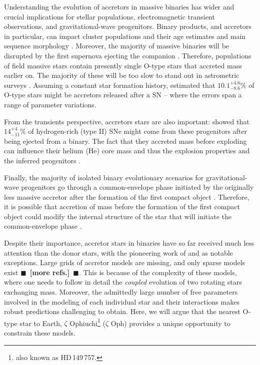 \documentclass[twocolumn,twocolappendix,trackchanges]{aastex63}
\newcommand{\zoph}{$\zeta$ Oph}
\newcommand{\todo}[1]{{\large $\blacksquare$~\textbf{\color{red}[#1]}}~$\blacksquare$}
\begin{document}
Understanding the evolution of accretors in massive binaries has wider
and crucial implications for stellar populations, electromagnetic
transient observations, and gravitational-wave progenitors. Binary
products, and accretors in particular, can impact cluster populations
and their age estimates and main sequence morphology
\citep[e.g.,][]{pols_marinus:94, wang:20}. Moreover, the majority of
massive binaries will be disrupted by the first supernova ejecting the
companion \citep[``binary SN scenario'', ][]{blaauw:61, dedonder:97,
  eldridge:11, renzo:19walk, evans:20}. Therefore, populations of
field massive stars contain presently single O-type stars that
accreted mass earlier on. The majority of these will be too slow to
stand out in astrometric surveys \citep[e.g.,][]{eldridge:11,
  renzo:19walk}. Assuming a constant star formation
history, \cite{renzo:19walk} estimated that $10.1^{+4.6}_{-8.6}\%$ of
O-type stars might be accretors released after a SN -- where the
errors span a range of parameter variations.

From the transients
perspective, accretors stars are also important: \cite{zapartas:19}
showed that $14_{-11}^{+4}\%$ of hydrogen-rich (type II) SNe might
come from these progenitors after being ejected from a binary. The
fact that they accreted mass before exploding can influence their
helium (He) core mass and thus the explosion properties and the
inferred progenitors \citep{zapartas:21}.

Finally, the majority of
isolated binary evolutionary scenarios for gravitational-wave
progenitors go through a common-envelope phase initiated by the
originally less massive accretor after the formation of the first
compact object \citep[e.g.,][]{belczynski:16nat, tauris:17,
  broekgaarden:21}. Therefore, it is possible that accretion of mass
before the formation of the first compact object could modify the
internal structure of the star that will initiate the common-envelope
phase \citep[e.g.][]{law-smith:20, klencki:21}.

Despite their importance, accretor stars in binaries have so far
received much less attention than the donor stars, with the pioneering
work of \cite{hellings:83, hellings:84} and \cite{braun:95} as notable
exceptions. Large grids of accretor models are missing, and only
sparse models exist \citep[e.g.,][]{cantiello:07}\todo{more
  refs.}. This is because of the complexity of these models, where one
needs to follow in detail the \emph{coupled} evolution of two rotating
stars exchanging mass. Moreover, the admittedly large number of free
parameters involved in the modeling of each individual star and their
interactions makes robust predictions challenging to obtain. Here, we
will argue that the nearest O-type star to Earth, $\zeta$
Ophiuchi\footnote{also known as HD\,149\,757.} (\zoph) provides a unique
opportunity to constrain these models.
\end{document}
